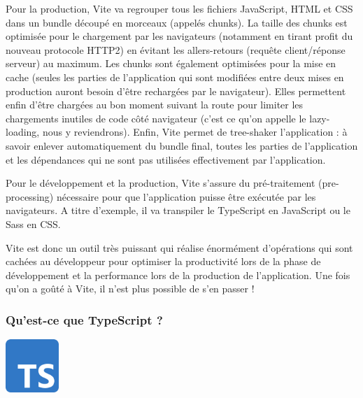 Pour la production, {\color{monOrange}Vite} va regrouper tous les fichiers {\color{monOrange}JavaScript, HTML} et {\color{monOrange}CSS} dans un {\color{monOrange}bundle} découpé en morceaux (appelés {\color{monOrange}chunks}). La taille des {\color{monOrange}chunks} est optimisée pour le chargement par les navigateurs (notamment en tirant profit du nouveau protocole {\color{monOrange}HTTP2}) en évitant les allers-retours (requête client/réponse serveur) au maximum. Les {\color{monOrange}chunks} sont également optimisées pour la mise en cache (seules les parties de l'application qui sont modifiées entre deux mises en production auront besoin d'être rechargées par le navigateur). Elles permettent enfin d'être chargées au bon moment suivant la route pour limiter les chargements inutiles de code côté navigateur (c'est ce qu'on appelle le {\color{monOrange}lazy-loading}, nous y reviendrons). Enfin, {\color{monOrange}Vite} permet de {\color{monOrange}tree-shaker} l'application : à savoir enlever automatiquement du {\color{monOrange}bundle} final, toutes les parties de l'application et les dépendances qui ne sont pas utilisées effectivement par l'application.

Pour le développement et la production, {\color{monOrange}Vite} s'assure du pré-traitement ({\color{monOrange}pre-processing}) nécessaire pour que l'application puisse être exécutée par les navigateurs. A titre d'exemple, il va transpiler le {\color{monOrange}TypeScript} en {\color{monOrange}JavaScript} ou le {\color{monOrange}Sass} en {\color{monOrange}CSS}.

{\color{monOrange}Vite} est donc un outil très puissant qui réalise énormément d'opérations qui sont cachées au développeur pour optimiser la productivité lors de la phase de développement et la performance lors de la production de l'application. Une fois qu'on a goûté à {\color{monOrange}Vite}, il n'est plus possible de s'en passer !

\subsubsection{Qu'est-ce que {\color{monOrange}TypeScript} ?}
\begin{center}
\includegraphics[width=2cm]{images/image03.png}
\end{center}

